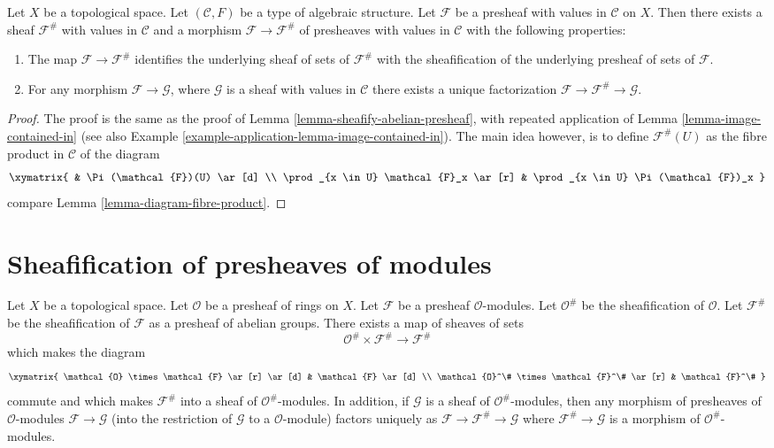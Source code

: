 \begin{lemma}
\label{lemma-sheafify-presheaf-structures}
Let $X$ be a topological space.
Let $(\mathcal{C}, F)$ be a type of algebraic structure.
Let $\mathcal{F}$ be a presheaf with values in $\mathcal{C}$
on $X$. Then there exists a sheaf $\mathcal{F}^\#$ with values
in $\mathcal{C}$ and a morphism $\mathcal{F} \to \mathcal{F}^\#$
of presheaves with values in $\mathcal{C}$ with the
following properties:
\begin{enumerate}
\item The map $\mathcal{F} \to \mathcal{F}^\#$ identifies
the underlying sheaf of sets of $\mathcal{F}^\#$ with
the sheafification of the underlying presheaf of sets of $\mathcal{F}$.
\item For any morphism $\mathcal{F} \to \mathcal{G}$, where
$\mathcal{G}$ is a sheaf with values in $\mathcal{C}$ there exists
a unique factorization $\mathcal{F} \to \mathcal{F}^\# \to \mathcal{G}$.
\end{enumerate}
\end{lemma}

\begin{proof}
The proof is the same as the proof of
Lemma \ref{lemma-sheafify-abelian-presheaf},
with repeated application of
Lemma \ref{lemma-image-contained-in} (see also
Example \ref{example-application-lemma-image-contained-in}).
The main idea however, is to define $\mathcal{F}^\#(U)$
as the fibre product in $\mathcal{C}$ of the diagram
$$
\xymatrix{
 &
\Pi(\mathcal{F})(U) \ar[d] \\
\prod_{x \in U} \mathcal{F}_x
\ar[r] &
\prod_{x \in U} \Pi(\mathcal{F})_x
}
$$
compare Lemma \ref{lemma-diagram-fibre-product}.
\end{proof}

\section{Sheafification of presheaves of modules}
\label{section-sheafification-presheaves-modules}

\begin{lemma}
\label{lemma-sheafification-presheaf-modules}
Let $X$ be a topological space.
Let $\mathcal{O}$ be a presheaf of rings on $X$.
Let $\mathcal{F}$ be a presheaf $\mathcal{O}$-modules.
Let $\mathcal{O}^\#$ be the sheafification of $\mathcal{O}$.
Let $\mathcal{F}^\#$ be the sheafification of $\mathcal{F}$
as a presheaf of abelian groups. There exists a map of
sheaves of sets
$$
\mathcal{O}^\# \times \mathcal{F}^\#
\longrightarrow
\mathcal{F}^\#
$$
which makes the diagram
$$
\xymatrix{
\mathcal{O} \times \mathcal{F} \ar[r] \ar[d] &
\mathcal{F} \ar[d] \\
\mathcal{O}^\# \times \mathcal{F}^\# \ar[r] &
\mathcal{F}^\#
}
$$
commute and which makes $\mathcal{F}^\#$ into a sheaf
of $\mathcal{O}^\#$-modules. In addition, if $\mathcal{G}$
is a sheaf of $\mathcal{O}^\#$-modules, then any morphism
of presheaves of $\mathcal{O}$-modules $\mathcal{F} \to \mathcal{G}$
(into the restriction of $\mathcal{G}$ to a $\mathcal{O}$-module)
factors uniquely as $\mathcal{F} \to \mathcal{F}^\# \to \mathcal{G}$
where $\mathcal{F}^\# \to \mathcal{G}$ is a morphism of
$\mathcal{O}^\#$-modules.
\end{lemma}

